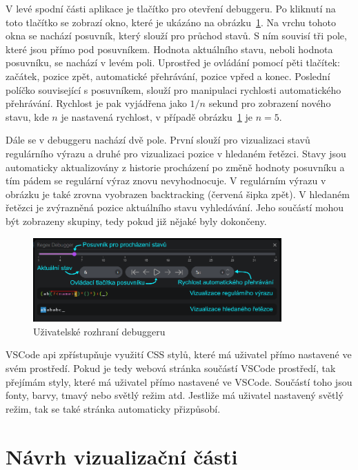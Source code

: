 V levé spodní části aplikace je tlačítko pro otevření debuggeru. 
Po kliknutí na toto tlačítko se zobrazí okno, které je ukázáno na obrázku~\ref{fig:DebuggerUI}.
Na vrchu tohoto okna se nachází posuvník, který slouží pro průchod stavů.
S ním souvisí tři pole, které jsou přímo pod posuvníkem.
Hodnota aktuálního stavu, neboli hodnota posuvníku, se nachází v levém poli.
Uprostřed je ovládání pomocí pěti tlačítek: začátek, pozice zpět, automatické přehrávání, pozice vpřed a konec.
Poslední políčko související s posuvníkem, slouží pro manipulaci rychlosti automatického přehrávání.
Rychlost je pak vyjádřena jako $1/n$ sekund pro zobrazení nového stavu, kde $n$ je nastavená rychlost, v případě obrázku~\ref{fig:DebuggerUI} je $n = 5$.

Dále se v debuggeru nachází dvě pole. 
První slouží pro vizualizaci stavů regulárního výrazu a druhé pro vizualizaci pozice v hledaném řetězci.
Stavy jsou automaticky aktualizovány z historie procházení po změně hodnoty posuvníku a tím pádem se regulární výraz znovu nevyhodnocuje.
V regulárním výrazu v obrázku je také zrovna vyobrazen backtracking (červená šipka zpět).
V hledaném řetězci je zvýrazněná pozice aktuálního stavu vyhledávání.
Jeho součástí mohou být zobrazeny skupiny, tedy pokud již nějaké byly dokončeny.

\begin{figure}[!h]
	\centering
	\includegraphics[width=0.85\textwidth]{Figures/appDebugger.png}
	\caption{Uživatelské rozhraní debuggeru}
	\label{fig:DebuggerUI}
\end{figure}

VSCode api zpřístupňuje využití CSS stylů, které má uživatel přímo nastavené ve svém prostředí.
Pokud je tedy webová stránka součástí VSCode prostředí, tak přejímám styly, které má uživatel přímo nastavené ve VSCode.
Součástí toho jsou fonty, barvy, tmavý nebo světlý režim atd.
Jestliže má uživatel nastavený světlý režim, tak se také stránka automaticky přizpůsobí.

\section{Návrh vizualizační části}

